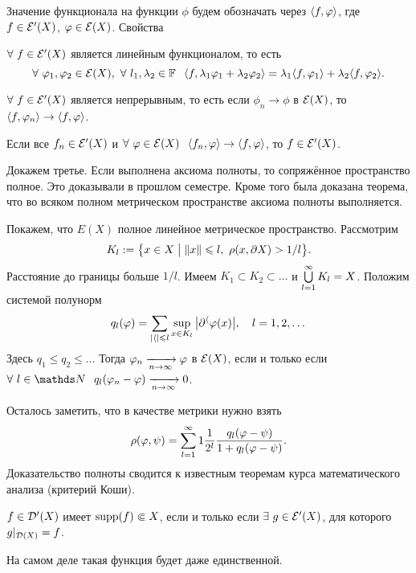 Значение функционала на функции $\phi$ будем обозначать через $\langle f,\varphi\rangle$, где $f\in\mathcal E'(X)$, $\varphi\in\mathcal E(X)$. Свойства
\begin{roItems}
\item $\forall\ f\in\mathcal E'(X)$ является линейным функционалом, то есть
	\[
	\forall\ \phi_1,\phi_2\in\E(X),\ \forall\ l_1,\l_2\in\F\pau
	\la f,\l_1\phi_1+\l_2\phi_2\ra = \l_1\la f,\phi_1\ra + \l_2\la f,\phi_2\ra.
	\]
\item $\forall\ f\in \mathcal E'(X)$ является непрерывным, то есть если $\phi_n\to\phi$ в $\mathcal E(X)$, то $\langle f,\varphi_n\rangle\rightarrow \langle f,\varphi\rangle$.
\item Если все $f_n\in\mathcal E'(X)$ и $\forall\ \phi\in\E(X)\pau \la f_n,\phi\ra \to\la f,\phi\ra$, то $f\in\mathcal E'(X)$.
\end{roItems}
\begin{Proof}
	Докажем третье.
Если выполнена аксиома полноты, то сопряжённое пространство полное. Это доказывали в прошлом семестре. Кроме того была доказана теорема, что во всяком полном метрическом пространстве аксиома полноты выполняется.

Покажем, что $E(X)$ полное линейное метрическое пространство. Рассмотрим
\[
	K_l:=\big\{x\in X\bigm|\|x\|\leqslant l,\ \rho(x,\partial X)>1/l\big\}.
\]
Расстояние до границы больше $1/l$. Имеем $K_1\subset K_2\subset\dots$ и $\bigcup\limits_{l=1}^\infty K_l = X$. Положим системой полунорм
\[
  q_l(\varphi) = \sum\limits_{|\langle|\leqslant l}\sup\limits_{x\in K_l}\big|\partial^\langle\varphi(x)\big|,\quad l = 1,2,\dots
\]
Здесь $q_1\le q_2\le\dots$ Тогда $\varphi_n\xrightarrow[n\rightarrow\infty]{}\varphi$ в $\mathcal E(X)$, если и только если $\forall\ l\in\N\pau q_l(\phi_n-\phi)\te0$.

Осталось заметить, что в качестве метрики нужно взять
\[
  \rho(\varphi,\psi) = \sum\limits_{{l}={1}}^\infty1\frac1{2^l}\frac{q_l(\varphi-\psi)}{1+q_l(\varphi-\psi)}.
\]
Доказательство полноты сводится к известным теоремам курса математического анализа (критерий Коши).
\end{Proof}
\begin{The}
	$f\in\mathcal D'(X)$ имеет $\operatorname{supp} (f)\Subset X$, если и только если $\exists\ g\in \mathcal E'(X)$, для которого $g|_{\mathcal D(X)} = f$.
\end{The}
На самом деле такая функция будет даже единственной.
